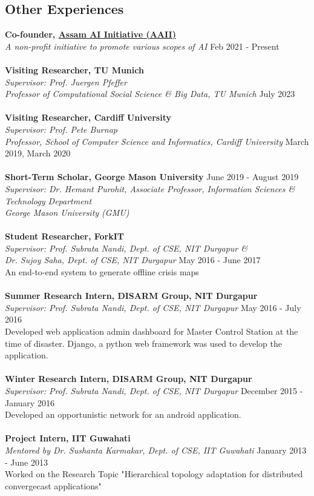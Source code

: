 \documentclass[margin, centered,lmodern]{res}
\begin{document}
\begin{resume}
\section{Other Experiences}
\textbf{Co-founder,  \href{https://aaii-axom.github.io/}{Assam AI Initiative (AAII)}} \\
\emph{A non-profit initiative to promote various scopes of AI} \hfill Feb 2021 - Present \\
\\
\textbf{Visiting Researcher, TU Munich} \\
\emph{Supervisor: Prof. Juergen Pfeffer\\ Professor of Computational Social Science \& Big Data, TU Munich} \hfill July 2023 \\
\\
\textbf{Visiting Researcher, Cardiff University} \\
\emph{Supervisor: Prof. Pete Burnap \\ Professor, School of Computer Science and Informatics, Cardiff University} \hfill March 2019,  March 2020 \\
\\
\textbf{Short-Term Scholar, George Mason University} \hfill June 2019 - August 2019\\
\emph{Supervisor: Dr. Hemant Purohit,  Associate Professor, Information Sciences \& Technology Department \\ George Mason University (GMU)}  \\
\\
\textbf{Student Researcher, ForkIT} \\
\emph{Supervisor: {Prof. Subrata Nandi, Dept. of CSE, NIT Durgapur} \& \\ {Dr. Sujoy Saha, Dept. of CSE, NIT Durgapur}} \hfill May 2016 - June 2017 \\
An end-to-end system to generate offline crisis maps \\
\\
\textbf{Summer Research Intern, DISARM Group, NIT Durgapur} \\
\emph{Supervisor: {Prof. Subrata Nandi, Dept. of CSE, NIT Durgapur}} \hfill May 2016 - July 2016 \\
Developed web application admin dashboard for Master Control Station at the time of disaster. Django, a python web framework was used to develop the application.\\
\\
\textbf{Winter Research Intern, DISARM Group, NIT Durgapur} \\
\emph{Supervisor: {Prof. Subrata Nandi, Dept. of CSE, NIT Durgapur}} \hfill December 2015 - January 2016 \\
Developed an opportunistic network for an android application.
\\
\\
\textbf{Project Intern, IIT Guwahati}  \\
\emph{Mentored by {Dr. Sushanta Karmakar, Dept. of CSE, IIT Guwahati}} \hfill January 2013 - June 2013 \\
Worked on the Research Topic "Hierarchical topology adaptation for distributed convergecast applications"



\end{resume}
\end{document}
